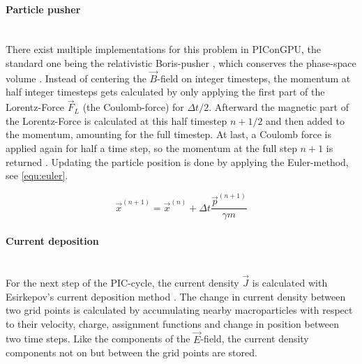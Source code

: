 \documentclass[bachelor_thesis]{subfiles}
\begin{document}
\paragraph*{Particle pusher}\hspace{0pt} \\
There exist multiple implementations for this problem in PIConGPU, the standard one being the relativistic Boris-pusher \cite{Boris1970}, which conserves the phase-space volume \cite{PICRepo}. Instead of centering the $\vec{B}$-field on integer timesteps, the momentum at half integer timesteps gets
calculated by only applying the first part of the Lorentz-Force $\vec{F}_L$ (the Coulomb-force) for $\Delta t/2$. Afterward the magnetic part of the Lorentz-Force is calculated at this half timestep $n+1/2$ and then added to the momentum, amounting for the full timestep.
At last, a Coulomb force is applied again for half a time step, so the momentum at the full step $n+1$ is returned \cite{Zenitani2018, Pausch2019}. Updating the particle position is done by applying the Euler-method, see \autoref{equ:euler}.

\begin{equation}
	\vec{x}^{(n+1)} = \vec{x}^{(n)} + \Delta t \frac{\vec{p}^{(n+1)}}{\gamma m}
	\label{equ:euler}
\end{equation}

\paragraph*{Current deposition}\hspace{0pt} \\
For the next step of the PIC-cycle, the current density $\vec{J}$ is calculated with Esirkepov’s current deposition method \cite{Esirkepov2001}.
The change in current density between two grid points is calculated by accumulating nearby macroparticles with respect to their velocity, charge, assignment functions and change in position between two time steps. 
Like the components of the $\vec{E}$-field, the current density components not on but between the grid points are stored.
\end{document}
